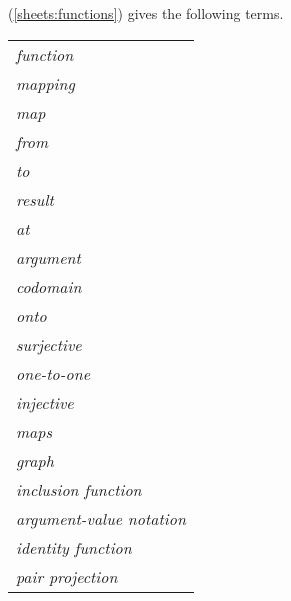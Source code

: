 \vspace{0.5cm}


(\ref{sheets:functions})
gives the following terms.

{ \tiny
\begin{tabular}{l}

\textit{function}
\\

\textit{mapping}
\\

\textit{map}
\\

\textit{from}
\\

\textit{to}
\\

\textit{result}
\\

\textit{at}
\\

\textit{argument}
\\

\textit{codomain}
\\

\textit{onto}
\\

\textit{surjective}
\\

\textit{one-to-one}
\\

\textit{injective}
\\

\textit{maps}
\\

\textit{graph}
\\

\textit{inclusion function}
\\

\textit{argument-value notation}
\\

\textit{identity function}
\\

\textit{pair projection}
\\

\end{tabular}
}


\clearpage{}

\newpage
\label{function_restrictions_and_extensions}
\label{sheets:function_restrictions_and_extensions}
\hypertarget{function_restrictions_and_extensions}{}


\clearpage


